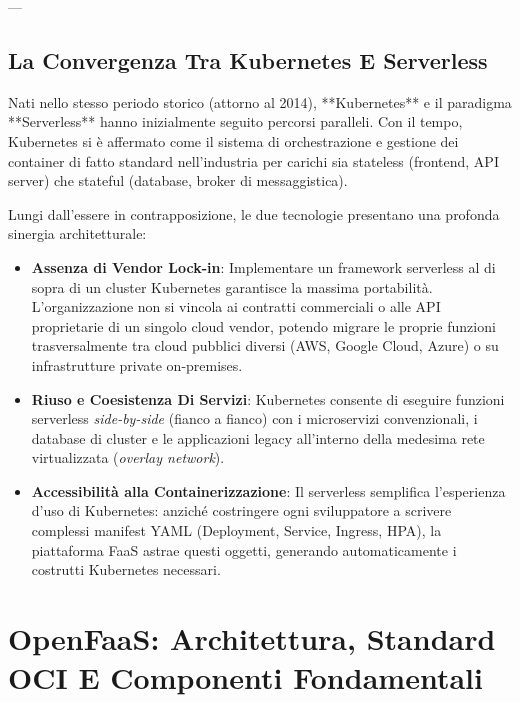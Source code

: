 \documentclass[11pt, a4paper]{article}
\begin{document}
---

\subsection{La Convergenza Tra Kubernetes E Serverless}

Nati nello stesso periodo storico (attorno al 2014), **Kubernetes** e il paradigma **Serverless** hanno inizialmente seguito percorsi paralleli. Con il tempo, Kubernetes si è affermato come il sistema di orchestrazione e gestione dei container di fatto standard nell'industria per carichi sia stateless (frontend, API server) che stateful (database, broker di messaggistica).

Lungi dall'essere in contrapposizione, le due tecnologie presentano una profonda sinergia architetturale:
\begin{itemize}
    \item \textbf{Assenza di Vendor Lock-in}: Implementare un framework serverless al di sopra di un cluster Kubernetes garantisce la massima portabilità. L'organizzazione non si vincola ai contratti commerciali o alle API proprietarie di un singolo cloud vendor, potendo migrare le proprie funzioni trasversalmente tra cloud pubblici diversi (AWS, Google Cloud, Azure) o su infrastrutture private on-premises.
    \item \textbf{Riuso e Coesistenza Di Servizi}: Kubernetes consente di eseguire funzioni serverless \emph{side-by-side} (fianco a fianco) con i microservizi convenzionali, i database di cluster e le applicazioni legacy all'interno della medesima rete virtualizzata (\emph{overlay network}).
    \item \textbf{Accessibilità alla Containerizzazione}: Il serverless semplifica l'esperienza d'uso di Kubernetes: anziché costringere ogni sviluppatore a scrivere complessi manifest YAML (Deployment, Service, Ingress, HPA), la piattaforma FaaS astrae questi oggetti, generando automaticamente i costrutti Kubernetes necessari.
\end{itemize}

\newpage


\section{OpenFaaS: Architettura, Standard OCI E Componenti Fondamentali}
\end{document}

